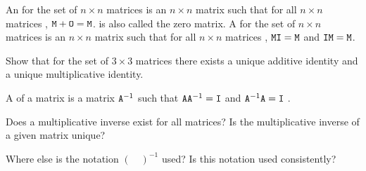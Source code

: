 \begin{defn}
	An  for the set of $n \times n$ matrices is an $n \times n$ matrix  such that for all $n \times n$ matrices , $\texttt{M}+\texttt{O} = \texttt{M}$.   is also called the zero matrix. A  for the set of $n \times n$ matrices is an $n \times n$ matrix  such that for all $n \times n$ matrices , $\texttt{MI} = \texttt{M}$  and $\texttt{IM} = \texttt{M}$. 
\end{defn}

\begin{myexb}[\bd{b}]
	Show that for the set of $3 \times 3$ matrices there exists a unique additive identity and a unique multiplicative identity.
\end{myexb}

\begin{defn}
	A  of a matrix  is a matrix $\texttt{A}^{-1}$ such that $\texttt{AA}^{-1}=\texttt{I}$ and $\texttt{A}^{-1}\texttt{A}=\texttt{I}$  .
\end{defn}

\begin{myexc}[\bd{c}]
	Does a multiplicative inverse exist for all matrices? Is the multiplicative inverse of a given matrix unique?
\end{myexc}

\noindent {} Where else is the notation $(\quad)^{-1}$ used?  Is this notation used consistently? 

\vspace{.5cm}


